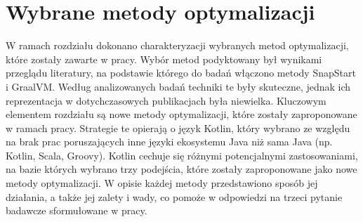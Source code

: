 \chapter{Wybrane metody optymalizacji}\label{chapter:wybrane_metody_optimalizacji}

W ramach rozdziału dokonano charakteryzacji wybranych metod optymalizacji, które zostały zawarte w pracy.
Wybór metod podyktowany był wynikami przeglądu literatury, na podstawie którego do badań włączono metody SnapStart i GraalVM.
Według analizowanych badań techniki te były skuteczne, jednak ich reprezentacja w dotychczasowych publikacjach była niewielka.
Kluczowym elementem rozdziału są nowe metody optymalizacji, które zostały zaproponowane w ramach pracy.
Strategie te opierają o język Kotlin, który wybrano ze względu na brak prac poruszających inne języki ekosystemu Java niż sama Java (np. Kotlin, Scala, Groovy).
Kotlin cechuje się różnymi potencjalnymi zastosowaniami, na bazie których wybrano trzy podejścia, które zostały zaproponowane jako nowe metody optymalizacji.
W opisie każdej metody przedstawiono sposób jej działania, a także jej zalety i wady, co pomoże w odpowiedzi na trzeci pytanie badawcze sformułowane w pracy.







